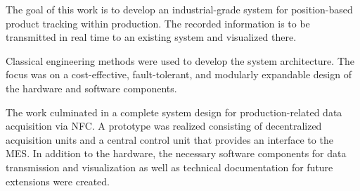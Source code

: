 The goal of this work is to develop an industrial-grade system for position-based product tracking within production. The recorded information is to be transmitted in real time to an existing system and visualized there.

Classical engineering methods were used to develop the system architecture. The focus was on a cost-effective, fault-tolerant, and modularly expandable design of the hardware and software components.

The work culminated in a complete system design for production-related data acquisition via NFC. A prototype was realized consisting of decentralized acquisition units and a central control unit that provides an interface to the MES. In addition to the hardware, the necessary software components for data transmission and visualization as well as technical documentation for future extensions were created.

\clearpage